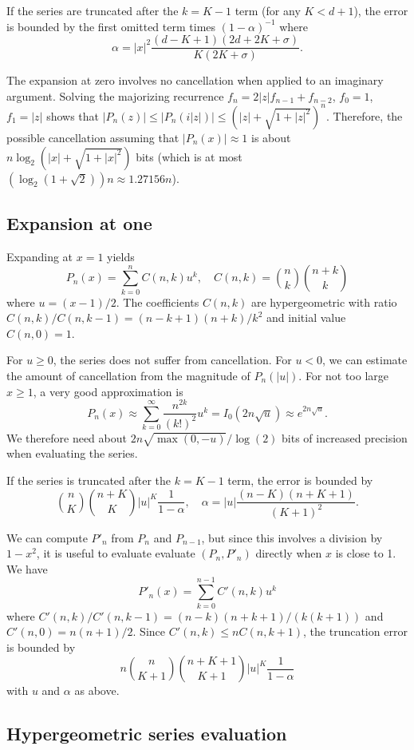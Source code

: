 \documentclass[11pt,a4paper]{article}
\begin{document}
If the series are truncated after the $k = K - 1$ term
(for any $K < d + 1$), the error is bounded by the first
omitted term times $(1-\alpha)^{-1}$
where
$$\alpha = |x|^2 \frac{(d-K+1)(2d+2K+\sigma)}{K (2K+\sigma)}.$$

The expansion at zero involves no cancellation
when applied to an imaginary argument.
Solving the majorizing recurrence $f_n = 2 |z| f_{n-1} + f_{n-2}$,
$f_0 = 1$, $f_1 = |z|$ shows that
$|P_n(z)| \le |P_n(i|z|)| \le \left(|z| + \sqrt{1 + |z|^2}\right)^n$.
Therefore, the possible cancellation assuming that $|P_n(x)| \approx 1$
is about $n \log_2(|x| + \sqrt{1 + |x|^2})$ bits
(which is at most $(\log_2 (1+\sqrt{2})) n \approx 1.27156n$).

\subsection{Expansion at one}

Expanding at $x = 1$ yields
$$P_n(x) = \sum_{k=0}^n C(n,k) u^k, \quad C(n,k) = {n \choose k} {n+k \choose k}$$
where $u = (x-1)/2$.
The coefficients $C(n,k)$ are hypergeometric with
ratio $C(n,k)/C(n,k-1) = (n-k+1)(n+k)/k^2$
and initial value $C(n,0) = 1$.

For $u \ge 0$, the series does not suffer from cancellation.
For $u < 0$, we can estimate the amount of
cancellation from the magnitude of $P_n(|u|)$.
For not too large $x \ge 1$, a very good approximation is
$$P_n(x) \approx \sum_{k=0}^{\infty} \frac{n^{2k}}{(k!)^2} u^k = I_0(2n\sqrt{u}) \approx e^{2n\sqrt{u}}.$$
We therefore need about $2n\sqrt{\max(0,-u)} / \log(2)$ bits
of increased precision when evaluating the series.

If the series is truncated after the $k = K - 1$ term,
the error is bounded by
$${n \choose K}{n+K \choose K} |u|^K \frac{1}{1-\alpha}, \quad \alpha = |u| \frac{(n-K)(n+K+1)}{(K+1)^2}.$$

We can compute $P'_n$ from $P_n$ and $P_{n-1}$, but since this
involves a division by $1-x^2$, it is useful to evaluate
evaluate $(P_n, P'_n)$ directly when $x$ is close to 1.
We have
$$P'_n(x) = \sum_{k=0}^{n-1} C'(n,k) u^k$$
where $C'(n,k)/C'(n,k-1) = (n-k)(n+k+1)/(k(k+1))$ and $C'(n,0) = n(n+1) / 2$.
Since $C'(n,k) \le n C(n,k+1)$, the truncation error is bounded by
$$n {n \choose K+1}{n+K+1 \choose K+1} |u|^K \frac{1}{1-\alpha}$$
with $u$ and $\alpha$ as above.

\subsection{Hypergeometric series evaluation}
\end{document}
